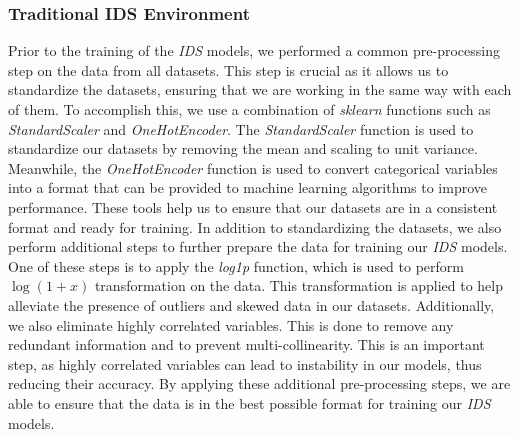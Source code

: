 \subsubsection{Traditional IDS Environment}
Prior to the training of the \textit{IDS} models, we performed a common pre-processing step on the data from all
datasets.
This step is crucial as it allows us to standardize the datasets, ensuring that we are working in the same way with
each of them.
To accomplish this, we use a combination of \textit{sklearn} functions such as \textit{StandardScaler} and
\textit{OneHotEncoder}.
The \textit{StandardScaler} function is used to standardize our datasets by removing the mean and scaling to unit
variance.
Meanwhile, the \textit{OneHotEncoder} function is used to convert categorical variables into a format that can be
provided to machine learning algorithms to improve performance.
These tools help us to ensure that our datasets are in a consistent format and ready for training.
In addition to standardizing the datasets, we also perform additional steps to further prepare the data for training
our \textit{IDS} models.
One of these steps is to apply the \textit{log1p} function, which is used to perform $\log(1+x)$ transformation on the
data.
This transformation is applied to help alleviate the presence of outliers and skewed data in our datasets.
Additionally, we also eliminate highly correlated variables.
This is done to remove any redundant information and to prevent multi-collinearity.
This is an important step, as highly correlated variables can lead to instability in our models, thus reducing their
accuracy.
By applying these additional pre-processing steps, we are able to ensure that the data is in the best possible format
for training our \textit{IDS} models.


